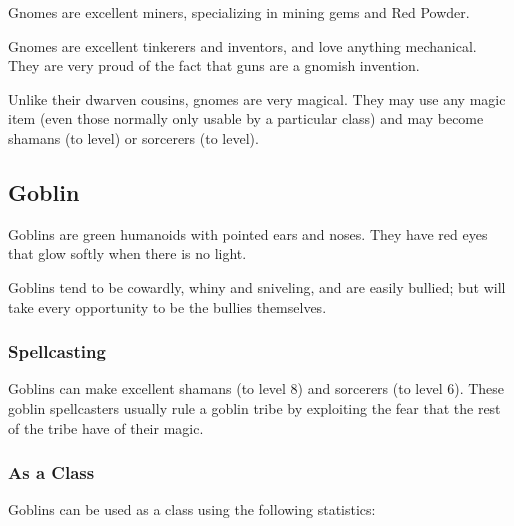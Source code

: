 \begin{multicols*}{2}
Gnomes are excellent miners, specializing in mining gems and Red Powder.

Gnomes are excellent tinkerers and inventors, and love anything mechanical. They are very proud of the fact that guns are a gnomish invention.

Unlike their dwarven cousins, gnomes are very magical. They may use any magic item (even those normally only usable by a particular class) and may become shamans (to  level) or sorcerers (to  level).

\subsection{Goblin}

Goblins are green humanoids with pointed ears and noses. They have red eyes that glow softly when there is no light.

Goblins tend to be cowardly, whiny and sniveling, and are easily bullied; but will take every opportunity to be the bullies themselves.

\subsubsection{Spellcasting}
Goblins can make excellent shamans (to level 8) and sorcerers (to level 6). These goblin spellcasters usually rule a goblin tribe by exploiting the fear that the rest of the tribe have of their magic.

\subsubsection{As a Class}
Goblins can be used as a class using the following statistics:


\end{multicols*}
